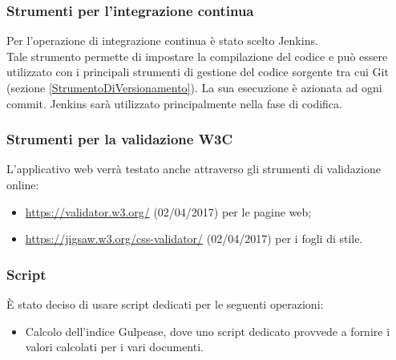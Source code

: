 \documentclass[../NormeDiProgetto.tex]{subfiles}
\begin{document}
			\subsubsection{Strumenti per l'integrazione continua}\label{IntegrazioneContinua}
				Per l'operazione di integrazione continua è stato scelto Jenkins.\\
				Tale strumento permette di impostare la compilazione del codice e può essere utilizzato con
				i principali strumenti di gestione del codice sorgente tra cui Git (sezione
				\ref{StrumentoDiVersionamento}).
				La sua esecuzione è azionata ad ogni commit.
				Jenkins sarà utilizzato principalmente nella fase di codifica.
			\subsubsection{Strumenti per la validazione W3C}
				L'applicativo web verrà testato anche attraverso gli strumenti di validazione online:
				\begin{itemize}
					\item \url{https://validator.w3.org/} (02/04/2017) per le pagine web;
					\item \url{https://jigsaw.w3.org/css-validator/} (02/04/2017) per i fogli di stile.
				\end{itemize}
			\subsubsection{Script}
				È stato deciso di usare script dedicati per le seguenti operazioni:
				\begin{itemize}
					\item Calcolo dell'indice Gulpease, dove uno script dedicato provvede a fornire i valori
					calcolati per i vari documenti.
				\end{itemize}
\end{document}
